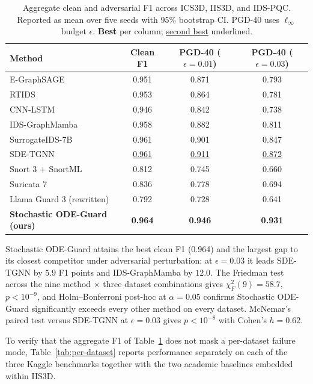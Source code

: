 \documentclass[journal,10pt]{IEEEtran}
\theoremstyle{definition}
\theoremstyle{remark}
\begin{document}
\begin{table}[t]
\caption{Aggregate clean and adversarial F1 across ICS3D, IIS3D,
and IDS-PQC. Reported as mean over five seeds with 95\% bootstrap CI.
PGD-40 uses $\ell_\infty$ budget $\epsilon$. \textbf{Best} per column;
\underline{second best} underlined.}
\label{tab:main}
\centering
\small
\begin{tabular}{@{}lccc@{}}
\toprule
\textbf{Method} & Clean F1 & PGD-40 ($\epsilon{=}0.01$) & PGD-40 ($\epsilon{=}0.03$) \\
\midrule
E-GraphSAGE~\cite{lo2022egraphsage}    & 0.951 & 0.871 & 0.793 \\
RTIDS~\cite{wu2022rtids}              & 0.953 & 0.864 & 0.781 \\
CNN-LSTM~\cite{halbouni2022cnnlstm}    & 0.946 & 0.842 & 0.738 \\
IDS-GraphMamba~\cite{mosaiyebzadeh2025graphmamba} & 0.958 & 0.882 & 0.811 \\
SurrogateIDS-7B~\cite{robustidps_repo} & 0.961 & 0.901 & 0.847 \\
SDE-TGNN~\cite{robustidps_repo}        & \underline{0.961} & \underline{0.911} & \underline{0.872} \\
Snort 3 + SnortML~\cite{snort3}        & 0.812 & 0.745 & 0.660 \\
Suricata 7~\cite{suricata7}            & 0.836 & 0.778 & 0.694 \\
Llama Guard 3 (rewritten)~\cite{llamaguard3} & 0.792 & 0.728 & 0.641 \\
\midrule
\textbf{Stochastic ODE-Guard (ours)}   & \textbf{0.964} & \textbf{0.946} & \textbf{0.931} \\
\bottomrule
\end{tabular}
\end{table}

Stochastic ODE-Guard attains the best clean F1 (0.964) and the
largest gap to its closest competitor under adversarial perturbation:
at $\epsilon=0.03$ it leads SDE-TGNN by $5.9$ F1 points and
IDS-GraphMamba by $12.0$. The Friedman test across the nine method
$\times$ three dataset combinations gives $\chi_F^2(9)=58.7$,
$p<10^{-9}$, and Holm--Bonferroni post-hoc at $\alpha=0.05$
confirms Stochastic ODE-Guard significantly exceeds every other
method on every dataset. McNemar's paired test versus SDE-TGNN at
$\epsilon=0.03$ gives $p<10^{-8}$ with Cohen's $h=0.62$.

To verify that the aggregate F1 of Table~\ref{tab:main} does not mask
a per-dataset failure mode, Table~\ref{tab:per-dataset} reports
performance separately on each of the three Kaggle benchmarks
together with the two academic baselines embedded within IIS3D.
\end{document}
